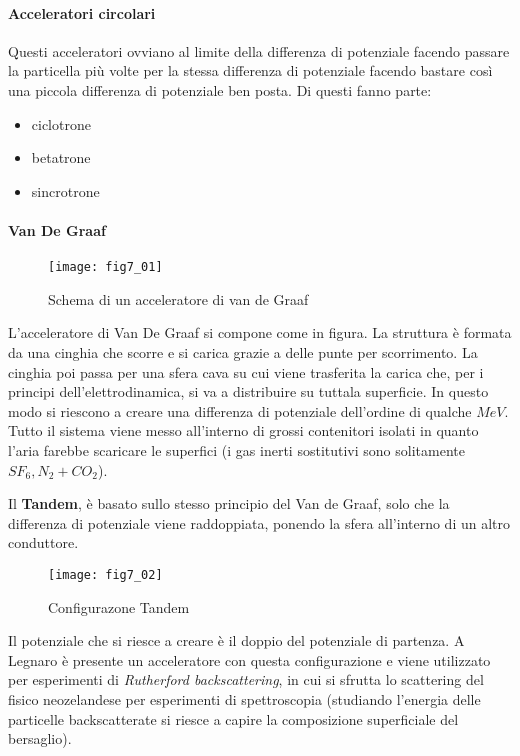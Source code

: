 \paragraph{Acceleratori circolari}
Questi acceleratori ovviano al limite della differenza di potenziale facendo passare la particella più volte per la stessa differenza di potenziale facendo bastare così una piccola differenza di potenziale ben posta.
Di questi fanno parte:
\begin{itemize}
\item ciclotrone
\item betatrone
\item sincrotrone
\end{itemize}

\paragraph{Van De Graaf}
\begin{figure}[h]
\centering 
\texttt{[image: fig7\_01]}
\caption{Schema di un acceleratore di van de Graaf}
\end{figure}
L'acceleratore di Van De Graaf si compone come in figura.
La struttura è formata da una cinghia che scorre e si carica grazie a delle punte per scorrimento.
La cinghia poi passa per una sfera cava su cui viene trasferita la carica che, per i principi dell'elettrodinamica, si va a distribuire su tuttala superficie.
In questo modo si riescono a creare una differenza di potenziale dell'ordine di qualche $MeV$.
Tutto il sistema viene messo all'interno di grossi contenitori isolati in quanto l'aria farebbe scaricare le superfici (i gas inerti sostitutivi sono solitamente $SF_6, N_2+CO_2$).

Il \textbf{Tandem}, è basato sullo stesso principio del Van de Graaf, solo che la differenza di potenziale viene raddoppiata, ponendo la sfera all'interno di un altro conduttore.
\begin{figure}[h]
\centering
\texttt{[image: fig7\_02]}
\caption{Configurazone Tandem}
\end{figure}
Il potenziale che si riesce a creare è il doppio del potenziale di partenza.
A Legnaro è presente un acceleratore con questa configurazione e viene utilizzato per esperimenti di \emph{Rutherford backscattering}, in cui si sfrutta lo scattering del fisico neozelandese per esperimenti di spettroscopia (studiando l'energia delle particelle backscatterate si riesce a capire la composizione superficiale del bersaglio).

